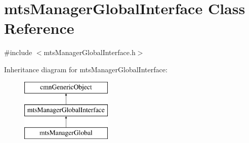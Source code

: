 \hypertarget{classmts_manager_global_interface}{\section{mts\-Manager\-Global\-Interface Class Reference}
\label{classmts_manager_global_interface}
}


{\ttfamily \#include $<$mts\-Manager\-Global\-Interface.\-h$>$}

Inheritance diagram for mts\-Manager\-Global\-Interface\-:\begin{figure}[H]
\begin{center}
\leavevmode
\includegraphics[height=3.000000cm]{df/de3/classmts_manager_global_interface}
\end{center}
\end{figure}

